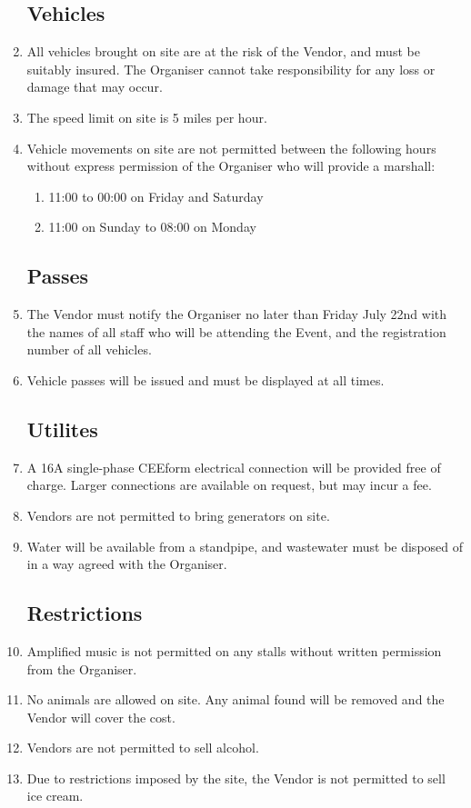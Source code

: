 \begin{enumerate}
\subsection*{Vehicles}
\item All vehicles brought on site are at the risk of the Vendor, and must be suitably insured.
        The Organiser cannot take responsibility for any loss or damage that may occur.
\item The speed limit on site is 5 miles per hour.
\item Vehicle movements on site are not permitted between the following hours without express
        permission of the Organiser who will provide a marshall:
\begin{enumerate}
    \item 11:00 to 00:00 on Friday and Saturday
    \item 11:00 on Sunday to 08:00 on Monday
\end{enumerate}

\subsection*{Passes}
\item The Vendor must notify the Organiser no later than Friday July 22nd with the names of
        all staff who will be attending the Event, and the registration number of all vehicles.
\item Vehicle passes will be issued and must be displayed at all times.

\subsection*{Utilites}
\item A 16A single-phase CEEform electrical connection will be provided free of charge. Larger
        connections are available on request, but may incur a fee.
\item Vendors are not permitted to bring generators on site.
\item Water will be available from a standpipe, and wastewater must be disposed of in a way
        agreed with the Organiser.

\subsection*{Restrictions}
\item Amplified music is not permitted on any stalls without written permission from the Organiser.
\item No animals are allowed on site. Any animal found will be removed and the Vendor will
        cover the cost.
\item Vendors are not permitted to sell alcohol.
\item Due to restrictions imposed by the site, the Vendor is not permitted to sell ice cream.


\end{enumerate}
